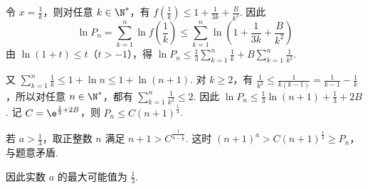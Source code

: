 \begin{solution}
\begin{enumerate}
令 \(x=\frac{1}{k}\)，则对任意 \(k\in \N^*\)，有 \(f\left( \frac{1}{k} \right)\le 1+\frac{1}{3k}+\frac{B}{k^2}\). 因此
\[
\ln P_n=\sum_{k=1}^{n}\ln f\left( \frac{1}{k} \right)
\le \sum_{k=1}^{n}\ln \left( 1+\frac{1}{3k}+\frac{B}{k^2} \right)
\]
由 \(\ln \left( 1+t \right)\le t\)（\(t>-1\)），得 \(\ln P_n\le \frac{1}{3}\sum_{k=1}^{n}\frac{1}{k}+B\sum_{k=1}^{n}\frac{1}{k^2}\).

又 \(\sum_{k=1}^{n}\frac{1}{k}\le 1+\ln n\le 1+\ln \left( n+1 \right)\). 对 \(k\ge 2\)，有 \(\frac{1}{k^2}\le \frac{1}{k\left( k-1 \right)}=\frac{1}{k-1}-\frac{1}{k}\)，所以对任意 \(n\in \N^*\)，都有 \(\sum_{k=1}^{n}\frac{1}{k^2}\le 2\). 因此
\(\ln P_n\le \frac{1}{3}\ln \left( n+1 \right)+\frac{1}{3}+2B\).
记 \(C=\e^{\frac{1}{3}+2B}\)，则 \(P_n\le C\left( n+1 \right)^{\frac{1}{3}}\).

若 \(a>\frac{1}{3}\)，取正整数 \(n\) 满足 \(n+1>C^{\frac{1}{a-\frac{1}{3}}}\). 这时 \(\left( n+1 \right)^a>C\left( n+1 \right)^{\frac{1}{3}}\ge P_n\)，与题意矛盾.

因此实数 \(a\) 的最大可能值为 \(\frac{1}{3}\).
\end{enumerate}
\end{solution}
